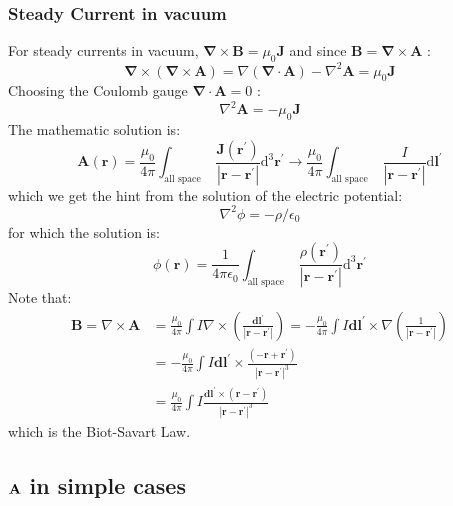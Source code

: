 \documentclass[12pt,a4paper]{article}
\begin{document}
\subsubsection{Steady Current in vacuum}
For steady currents in vacuum, $\boldsymbol{\nabla} \times \boldsymbol{B}=\mu_0 \boldsymbol{J}$ and since $\boldsymbol{B}=\boldsymbol{\nabla} \times \boldsymbol{A}$ :
$$
\boldsymbol{\nabla} \times(\boldsymbol{\nabla} \times \boldsymbol{A})=\nabla(\boldsymbol{\nabla} \cdot \boldsymbol{A})-\nabla^2 \boldsymbol{A}=\mu_0 \boldsymbol{J}
$$
Choosing the Coulomb gauge $\boldsymbol{\nabla} \cdot \boldsymbol{A}=0$ :
$$
\nabla^2 \boldsymbol{A}=-\mu_0 \boldsymbol{J}
$$
The mathematic solution is:
$$
\boldsymbol{A}(\boldsymbol{r})=\frac{\mu_0}{4 \pi} \int_{\text {all space }} \frac{\boldsymbol{J}\left(\boldsymbol{r}^{\prime}\right)}{\left|\boldsymbol{r}-\boldsymbol{r}^{\prime}\right|} \mathrm{d}^3 \boldsymbol{r}^{\prime} \longrightarrow \frac{\mu_0}{4 \pi} \int_{\text {all space }} \frac{I}{\left|\boldsymbol{r}-\boldsymbol{r}^{\prime}\right|} \mathrm{d} \boldsymbol{l}^{\prime}
$$
which we get the hint from the solution of the electric potential:
$$
\nabla^2 \phi=-\rho / \epsilon_0
$$
for which the solution is:
$$
\phi(\boldsymbol{r})=\frac{1}{4 \pi \epsilon_0} \int_{\text {all space }} \frac{\rho\left(\boldsymbol{r}^{\prime}\right)}{\left|\boldsymbol{r}-\boldsymbol{r}^{\prime}\right|} \mathrm{d}^3 \boldsymbol{r}^{\prime}
$$
Note that:
$$
\begin{aligned}
\boldsymbol{B}=\nabla \times \boldsymbol{A} & =\frac{\mu_0}{4 \pi} \int I \nabla \times\left(\frac{\mathbf{d} \boldsymbol{l}^{\prime}}{\left|\boldsymbol{r}-\boldsymbol{r}^{\prime}\right|}\right)=-\frac{\mu_0}{4 \pi} \int I \mathbf{d} \boldsymbol{l}^{\prime} \times \nabla\left(\frac{1}{\left|\boldsymbol{r}-\boldsymbol{r}^{\prime}\right|}\right) \\
& =-\frac{\mu_0}{4 \pi} \int I \mathbf{d} \boldsymbol{l}^{\prime} \times \frac{\left(-\boldsymbol{r}+\boldsymbol{r}^{\prime}\right)}{\left|\boldsymbol{r}-\boldsymbol{r}^{\prime}\right|^3} \\
& =\frac{\mu_0}{4 \pi} \int I \frac{\mathbf{d} \boldsymbol{l}^{\prime} \times\left(\boldsymbol{r}-\boldsymbol{r}^{\prime}\right)}{\left|\boldsymbol{r}-\boldsymbol{r}^{\prime}\right|^3}
\end{aligned}
$$
which is the Biot-Savart Law.
\subsection{$\vb{A}$ in simple cases}
\end{document}
